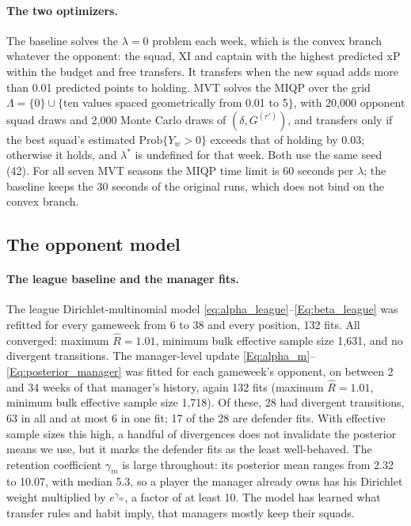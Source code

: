 \documentclass[12pt,oneside,a4paper]{book}
\theoremstyle{definition}
\theoremstyle{remark}
\begin{document}
	\paragraph{The two optimizers.} The baseline solves the $\lambda=0$ problem each week, which is
	the convex branch whatever the opponent: the squad, XI and captain with the highest predicted
	xP within the budget and free transfers. It transfers when the new squad adds more than 0.01
	predicted points to holding. MVT solves the MIQP over the grid $\Lambda=\{0\}\cup\{$ten values
	spaced geometrically from 0.01 to 5$\}$, with 20{,}000 opponent squad draws and 2{,}000 Monte
	Carlo draws of $(\delta,G^{(r')})$, and transfers only if the best squad's estimated
	$\mathrm{Prob}\{Y_w>0\}$ exceeds that of holding by 0.03; otherwise it holds, and $\lambda^*$
	is undefined for that week. Both use the same seed (42). For all seven MVT seasons the MIQP time
	limit is 60 seconds per $\lambda$; the baseline keeps the 30 seconds of the original runs, which
	does not bind on the convex branch.

	\subsection{The opponent model}
	\label{sec:s2-opponent}

	\paragraph{The league baseline and the manager fits.} The league Dirichlet-multinomial model
	\eqref{eq:alpha_league}--\eqref{Eq:beta_league} was refitted for every gameweek from 6 to 38 and every position, 132 fits. All
	converged: maximum $\hat R=1.01$, minimum bulk effective sample size 1{,}631, and no divergent
	transitions. The manager-level update \eqref{Eq:alpha_m}--\eqref{Eq:posterior_manager} was fitted for each gameweek's opponent, on
	between 2 and 34 weeks of that manager's history, again 132 fits (maximum $\hat R=1.01$, minimum
	bulk effective sample size 1{,}718). Of these, 28 had divergent transitions, 63 in all and at
	most 6 in one fit; 17 of the 28 are defender fits. With effective sample sizes this high, a
	handful of divergences does not invalidate the posterior means we use, but it marks the
	defender fits as the least well-behaved.
	The retention coefficient $\gamma_m$ is large throughout: its posterior mean ranges from 2.32 to
	10.07, with median 5.3, so a player the manager already owns has his Dirichlet weight
	multiplied by $e^{\gamma_m}$, a factor of at least 10. The model has learned what transfer rules
	and habit imply, that managers mostly keep their squads.
\end{document}

